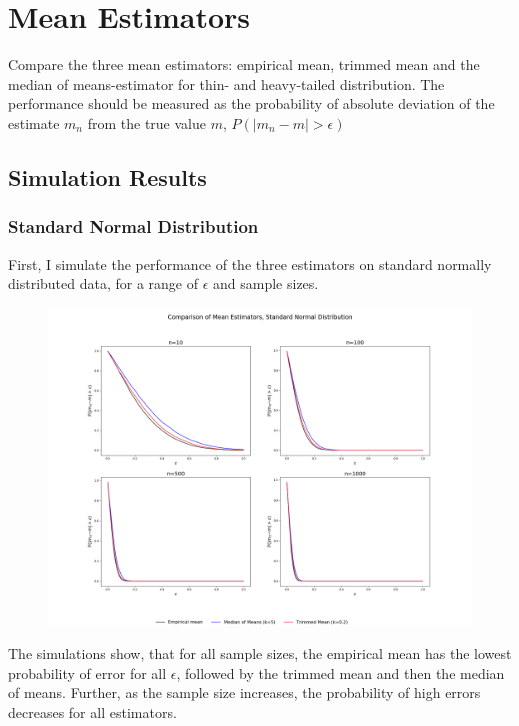 \documentclass[a4paper, 11pt]{article} %
\begin{document}
\section{Mean Estimators} 

Compare the three mean estimators: empirical mean, trimmed mean and the median of means-estimator for thin- and heavy-tailed distribution. The performance should be measured as the probability of absolute deviation of the estimate $m_n$ from the true value $m$, $P\left( |m_n - m | > \epsilon \right)$

\subsection{Simulation Results}

\subsubsection{Standard Normal Distribution}

First, I simulate the performance of the three estimators on standard normally distributed data, for a range of $\epsilon$ and sample sizes.

\begin{figure}[H]
\centering
\includegraphics[scale= 0.3]{Gaussian_Base}
\end{figure}

\noindent The simulations show, that for all sample sizes, the empirical mean has the lowest probability of error for all $\epsilon$, followed by the trimmed mean and then the median of means. Further, as the sample size increases, the probability of high errors decreases for all estimators. \\
\end{document}
